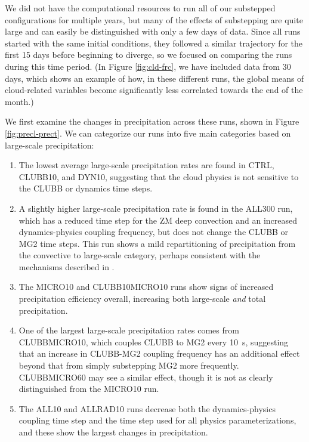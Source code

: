 \documentclass [11pt, proquest] {uwthesis}[2020/02/24]
\begin{document}
We did not have the computational resources to run all of our substepped configurations for multiple years, but many of the effects of substepping are quite large and can easily be distinguished with only a few days of data. Since all runs started with the same initial conditions, they followed a similar trajectory for the first \num{15} days before beginning to diverge, so we focused on comparing the runs during this time period. (In Figure \ref{fig:cld-frc}, we have included data from \num{30} days, which shows an example of how, in these different runs, the global means of cloud-related variables become significantly less correlated towards the end of the month.)

We first examine the changes in precipitation across these runs, shown in Figure \ref{fig:precl-prect}. We can categorize our runs into five main categories based on large-scale precipitation:

\begin{enumerate}
\item The lowest average large-scale precipitation rates are found in CTRL, CLUBB10, and DYN10, suggesting that the cloud physics is not sensitive to the CLUBB or dynamics time steps.
\item A slightly higher large-scale precipitation rate is found in the ALL300 run, which has a reduced time step for the ZM deep convection and an increased dynamics-physics coupling frequency, but does not change the CLUBB or MG2 time steps. This run shows a mild repartitioning of precipitation from the convective to large-scale category, perhaps consistent with the mechanisms described in \cite{Williamson2013}.
\item The MICRO10 and CLUBB10MICRO10 runs show signs of increased precipitation efficiency overall, increasing both large-scale \emph{and} total precipitation.
\item One of the largest large-scale precipitation rates comes from CLUBBMICRO10, which couples CLUBB to MG2 every \SI{10}{\second}, suggesting that an increase in CLUBB-MG2 coupling frequency has an additional effect beyond that from simply substepping MG2 more frequently. CLUBBMICRO60 may see a similar effect, though it is not as clearly distinguished from the MICRO10 run.
\item The ALL10 and ALLRAD10 runs decrease both the dynamics-physics coupling time step and the time step used for all physics parameterizations, and these show the largest changes in precipitation.
\end{enumerate}
\end{document}
